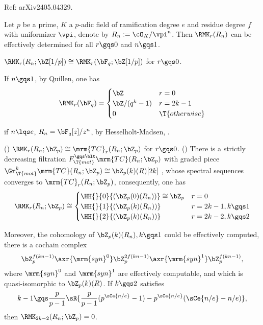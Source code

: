 \documentclass[article, a4paper, twoside]{universal}
\begin{document}
\confighead{}{}{}

Ref: arXiv2405.04329.

\begin{stp}
    Let $p$ be a prime, $K$ a $p$-adic field of ramification degree $e$ and residue degree $f$ with uniformizer $\vpi$, denote by $R_{n}:=\cO_{K}/\vpi^{n}$. Then $\RMK_{r}(R_{n})$ can be effectively determined for all $r\gqs0$ and $n\gqs1$.

\end{stp}

 $\RMK_{r}(R_{n};\bZ[1/p])\cong \RMK_{r}(\bF_{q};\bZ[1/p])$ for $r\gqs0$.
\begin{cmt}[1]
If $n\gqs1$, by Quillen\cite{Quillen1972}, one has
\[
    \RMK_{r}(\bF_{q})=\begin{cases}
      \bZ & r = 0 \\
      \bZ/(q^{k}-1) & r = 2k-1 \\
      0 & \T{otherwise}
    \end{cases}
\]

if $n\lqs e$, $R_{n}=\bF_{q}[z]/z^{n}$, by Hesselholt-Madsen\cite{HM1997Cyclic}, .
\end{cmt}

(\cite{DGMC2013}) $\RMK_{r}(R_{n};\bZ_{p})\cong\mrm{TC}_{r}(R_{n};\bZ_{p})$ for $r\gqs0$. (\cite{BMS2019}) There is a strictly decreasing filtration $F_{\T{mot}}^{\gqs\blt}\mrm{TC}(R_{n};\bZ_{p})$ with graded piece $\Gr_{\T{mot}}^{k}\mrm{TC}(R_{n};\bZ_{p})\cong\bZ_{p}(k)(R)[2k]$ , whose spectral sequences converges to $\mrm{TC}_{r}(R_{n};\bZ_{p})$, consequently, one has
\[
    \RMK_{r}(R_{n};\bZ_{p})\cong \begin{cases}
      \HH{}{0}{(\bZ_{p}(0)(R_{n}))}\cong \bZ_{p} & r = 0 \\
      \HH{}{1}{(\bZ_{p}(k)(R_{n}))} & r=2k-1, k\gqs1 \\
      \HH{}{2}{(\bZ_{p}(k)(R_{n}))} & r=2k-2, k\gqs2
    \end{cases}
\]


Moreover, the cohomology of $\bZ_{p}(k)(R_{n}),k\gqs1$ could be effectively computed, there is a cochain complex
\[
    \bZ_{p}^{f(kn-1)}\axr{\mrm{syn}^{0}}\bZ_{p}^{2f(kn-1)}\axr{\mrm{syn}^{1}}\bZ_{p}^{f(kn-1)},
\]
where $\mrm{syn}^{0}$ and $\mrm{syn}^{1}$ are effectively computable, and which is quasi-isomorphic to $\bZ_{p}(k)(R)$. If $k\gqs2$ satisfies
\[
    k-1\gqs\frac{p}{p-1}\sR{\frac{p}{p-1}(p^{\sCe{n/e}}-1)-p^{\sCe{n/e}}(\sCe{n/e}-n/e)},
\]
then $\RMK_{2k-2}(R_{n};\bZ_{p})=0$.



\printref
\end{document}
